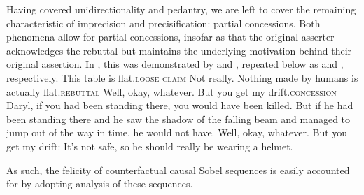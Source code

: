 Having covered unidirectionality and pedantry, we are left to cover the remaining characteristic of imprecision and precisification: partial concessions. Both phenomena allow for partial concessions, insofar as that the original asserter acknowledges the rebuttal but maintains the underlying motivation behind their original assertion. In , this was demonstrated by  and , repeated below as  and , respectively.
\pex{}%
\a{}This table is flat.\hfill{\scshape loose claim}
\a{}Not really. Nothing made by humans is actually flat.\hfill{\scshape rebuttal}
\a{}Well, okay, whatever. But you get my drift.\hfill{\scshape concession}\\
\emptyfill\parencite[p.~113]{Klecha2014}
\xe
\pex{}%
			\a	{}Daryl, if you had been standing there, you would have been killed.
			\a	{}But if he had been standing there and he saw the shadow of the falling beam and managed to jump out of the way in time, he would not have.
			\a	{}Well, okay, whatever. But you get my drift: It's not safe, so he should really be wearing a helmet.\hfill\parencite[adapted from][p.~139]{Klecha2015}
\xe

\noindent As such, the felicity of counterfactual causal Sobel sequences is easily accounted for by adopting  analysis of these sequences.

